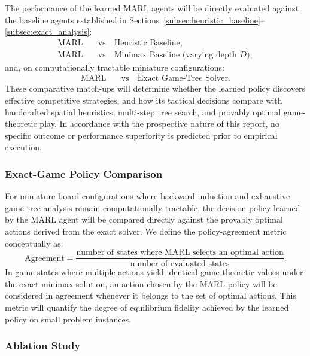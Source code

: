 \documentclass{article}
\begin{document}
The performance of the learned MARL agents will be directly evaluated against the baseline agents established in Sections~\ref{subsec:heuristic_baseline}--\ref{subsec:exact_analysis}:
\begin{align*}
\text{MARL} &\quad\text{vs}\quad \text{Heuristic Baseline}, \\
\text{MARL} &\quad\text{vs}\quad \text{Minimax Baseline (varying depth } D\text{)},
\end{align*}
and, on computationally tractable miniature configurations:
\begin{align*}
\text{MARL} &\quad\text{vs}\quad \text{Exact Game-Tree Solver}.
\end{align*}
These comparative match-ups will determine whether the learned policy discovers effective competitive strategies, and how its tactical decisions compare with handcrafted spatial heuristics, multi-step tree search, and provably optimal game-theoretic play. In accordance with the prospective nature of this report, no specific outcome or performance superiority is predicted prior to empirical execution.

\subsubsection{Exact-Game Policy Comparison}
\label{subsubsec:exact_policy_comparison}

For miniature board configurations where backward induction and exhaustive game-tree analysis remain computationally tractable, the decision policy learned by the MARL agent will be compared directly against the provably optimal actions derived from the exact solver. We define the policy-agreement metric conceptually as:
\begin{equation}
\text{Agreement} = \frac{\text{number of states where MARL selects an optimal action}}{\text{number of evaluated states}}.
\end{equation}
In game states where multiple actions yield identical game-theoretic values under the exact minimax solution, an action chosen by the MARL policy will be considered in agreement whenever it belongs to the set of optimal actions. This metric will quantify the degree of equilibrium fidelity achieved by the learned policy on small problem instances.

\subsubsection{Ablation Study}
\label{subsubsec:ablation_study}
\end{document}
